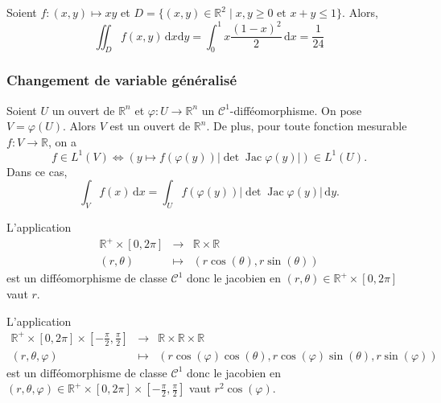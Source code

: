 
  \begin{example}
    Soient $f : (x,y) \mapsto xy$ et $D = \{ (x,y) \in \mathbb{R}^2 \mid x, y \geq 0 \text{ et } x + y \leq 1 \}$. Alors,
    \[ \iint_D f(x,y) \, \mathrm{d}x \mathrm{d}y = \int_0^1 x \frac{(1-x)^2}{2} \, \mathrm{d}x = \frac{1}{24} \]
  \end{example}

  \subsubsection{Changement de variable généralisé}


  \begin{theorem}
    Soient $U$ un ouvert de $\mathbb{R}^n$ et $\varphi : U \to \mathbb{R}^n$ un $\mathcal{C}^1$-difféomorphisme. On pose $V = \varphi(U)$. Alors $V$ est un ouvert de $\mathbb{R}^n$. De plus, pour toute fonction mesurable $f : V \to \mathbb{R}$, on a
    \[
      f \in L^1(V)
      \iff
      \left(y \mapsto
      f(\varphi(y)) \left| \det \operatorname{Jac}\varphi(y) \right|\right)
      \in L^1(U).
    \]
    Dans ce cas,
    \[
      \int_V f(x) \, \mathrm{d}x
      =
      \int_U f(\varphi(y))
      \left| \det \operatorname{Jac}\varphi(y) \right| \, \mathrm{d}y.
    \]
  \end{theorem}


  \begin{example}
    L'application
    \[
      \begin{array}{ccc}
        \mathbb{R}^+ \times [0,2\pi] &\rightarrow& \mathbb{R} \times \mathbb{R} \\
        (r,\theta) &\mapsto& (r\cos(\theta), r\sin(\theta))
      \end{array}
    \]
    est un difféomorphisme de classe $\mathcal{C}^1$ donc le jacobien en $(r,\theta) \in \mathbb{R}^+ \times [0,2\pi]$ vaut $r$.
  \end{example}

  \begin{example}
    L'application
    \[
      \begin{array}{ccc}
        \mathbb{R}^+ \times [0,2\pi] \times \left[ -\frac{\pi}{2}, \frac{\pi}{2} \right] &\rightarrow& \mathbb{R} \times \mathbb{R} \times \mathbb{R} \\
        (r,\theta,\varphi) &\mapsto& (r\cos(\varphi)\cos(\theta), r\cos(\varphi)\sin(\theta), r\sin(\varphi))
      \end{array}
    \]
    est un difféomorphisme de classe $\mathcal{C}^1$ donc le jacobien en $(r,\theta,\varphi) \in \mathbb{R}^+ \times [0,2\pi] \times \left[ -\frac{\pi}{2}, \frac{\pi}{2} \right]$ vaut $r^2 \cos(\varphi)$.
  \end{example}


